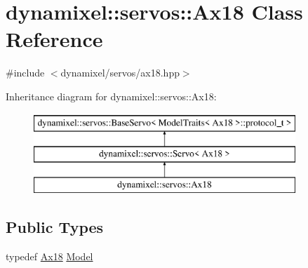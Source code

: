 \hypertarget{classdynamixel_1_1servos_1_1_ax18}{}\section{dynamixel\+:\+:servos\+:\+:Ax18 Class Reference}
\label{classdynamixel_1_1servos_1_1_ax18}


{\ttfamily \#include $<$dynamixel/servos/ax18.\+hpp$>$}

Inheritance diagram for dynamixel\+:\+:servos\+:\+:Ax18\+:\begin{figure}[H]
\begin{center}
\leavevmode
\includegraphics[height=3.000000cm]{classdynamixel_1_1servos_1_1_ax18}
\end{center}
\end{figure}
\subsection*{Public Types}
\begin{DoxyCompactItemize}
\item 
typedef \hyperlink{classdynamixel_1_1servos_1_1_ax18}{Ax18} \hyperlink{classdynamixel_1_1servos_1_1_ax18_a005e1fa0cdc17c97805ce5e3a8de6016}{Model}
\end{DoxyCompactItemize}
